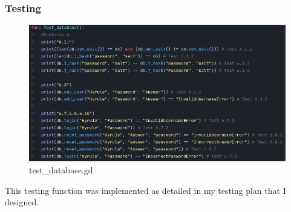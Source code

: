 \documentclass{article}
\begin{document}
        \subsubsection{Testing}
        \begin{figure}[H]
                \centering
                \includegraphics[width = \columnwidth]{images/development/test_database.PNG}
                \caption{test\_database.gd}
        \end{figure}
        This testing function was implemented as detailed in my testing plan that I designed.\\
\end{document}
